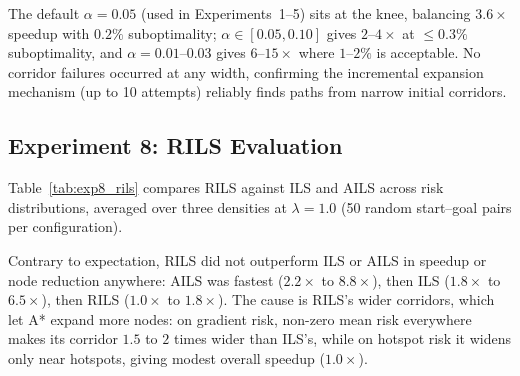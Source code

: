 \documentclass[preprint,12pt,authoryear]{elsarticle}
\begin{document}
The default $\alpha = 0.05$ (used in Experiments~1--5) sits at the knee, balancing $3.6\times$ speedup with $0.2\%$ suboptimality; $\alpha \in [0.05, 0.10]$ gives $2$--$4\times$ at $\leq 0.3\%$ suboptimality, and $\alpha = 0.01$--$0.03$ gives $6$--$15\times$ where $1$--$2\%$ is acceptable. No corridor failures occurred at any width, confirming the incremental expansion mechanism (up to 10 attempts) reliably finds paths from narrow initial corridors.

\subsection{Experiment 8: RILS Evaluation}

Table~\ref{tab:exp8_rils} compares RILS against ILS and AILS across risk distributions, averaged over three densities at $\lambda = 1.0$ (50 random start--goal pairs per configuration).

\begin{table}[!htbp]
\centering
\caption{RILS vs.\ ILS and AILS at $\lambda = 1.0$ (mean across three densities, 50 maps each). Speed = speedup vs.\ A*; Red = node reduction \%; Opt = path cost ratio $\pm$ 95\% CI.}
\label{tab:exp8_rils}
\end{table}

Contrary to expectation, RILS did not outperform ILS or AILS in speedup or node reduction anywhere: AILS was fastest ($2.2\times$ to $8.8\times$), then ILS ($1.8\times$ to $6.5\times$), then RILS ($1.0\times$ to $1.8\times$). The cause is RILS's wider corridors, which let A* expand more nodes: on gradient risk, non-zero mean risk everywhere makes its corridor $1.5$ to $2$ times wider than ILS's, while on hotspot risk it widens only near hotspots, giving modest overall speedup ($1.0\times$).
\end{document}
